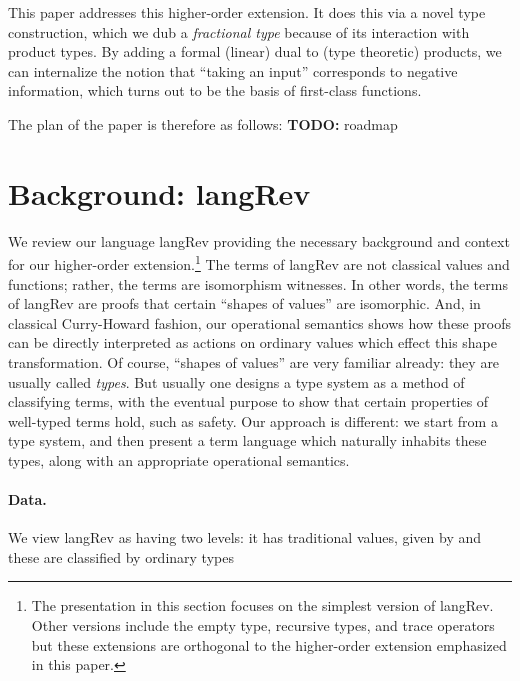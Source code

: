 \documentclass{llncs}
\newcommand{\todo}[1]{\textbf{TODO:} #1}
\begin{document}
This paper addresses this higher-order extension.  It does this via a novel
type construction, which we dub a \emph{fractional type} because of its
interaction with product types.  By adding a formal (linear) dual to
(type theoretic) products, we can internalize the notion that ``taking an
input'' corresponds to negative information, which turns out to be the 
basis of first-class functions.

The plan of the paper is therefore
as follows: \todo{roadmap}

\section{Background: {{langRev}} }
\label{sec:pi}

We review our language {{langRev}} providing the necessary background and
context for our higher-order extension.\footnote{The presentation in this
  section focuses on the simplest version of {{langRev}}. Other versions
  include the empty type, recursive types, and trace operators but these
  extensions are orthogonal to the higher-order extension emphasized in this
  paper.} The terms of {{langRev}} are not classical values and functions;
rather, the terms are isomorphism witnesses.  In other words, the terms of
{{langRev}} are proofs that certain ``shapes of values'' are isomorphic.
And, in classical Curry-Howard fashion, our operational semantics shows how
these proofs can be directly interpreted as actions on ordinary values which
effect this shape transformation. Of course, ``shapes of values'' are very
familiar already: they are usually called \emph{types}.  But usually one
designs a type system as a method of classifying terms, with the eventual
purpose to show that certain properties of well-typed terms hold, such as
safety.  Our approach is different: we start from a type system, and then
present a term language which naturally inhabits these types, along with an
appropriate operational semantics.

\paragraph*{Data.}
We view {{langRev}} as having two levels:  it has traditional values, given by
\noindent and these are classified by ordinary types
\end{document}
